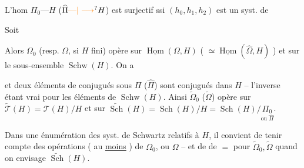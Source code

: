 
L'hom $\Pi_0\text{---}H$ ($\widehat\Pi\unsure{\text{---}|\longrightarrow}H$) est surjectif ssi $(h_0,h_1,h_2)$ est un syst. de 


Soit 


Alors $\Omega_0$ (resp. $\Omega$, si $H$ fini) opère  sur  $\underline{\operatorname{Hom}}(\Omega,H)$ ( $\simeq\underline{\operatorname{Hom}}(\widehat\Omega,H)$ ) et sur le sous-ensemble $\operatorname{Schw}(H)$. On a


et deux éléments de  conjugués sous $\Pi$ ($\widehat\Pi$) sont conjugués dans $H$ -- l'inverse étant vrai pour les éléments de $\operatorname{Schw}(H)$. Ainsi $\widetilde\Omega_0$ ($\widetilde\Omega$) opère sur $\widetilde{\mathcal T}(H)=\mathcal T(H)/H$ et sur $\widetilde{\operatorname{Sch}}(H)=\operatorname{Sch}(H)/H=\operatorname{Sch}(H)/\underset{\text{ou }\widehat\Pi}{\Pi_0}$.

 Dans une énumération des syst. de Schwartz relatifs à $H$, il convient de tenir compte des opérations ( au \uline{moins} ) de $\Omega_0$, ou $\Omega$ -- et de de $=$ pour $\widetilde\Omega_0,\widetilde\Omega$ quand on envisage $\widetilde{\operatorname{Sch}}(H)$.

